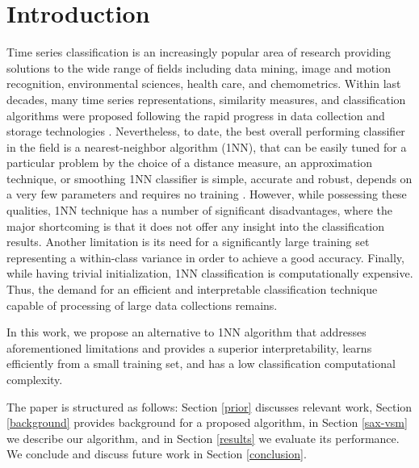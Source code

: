 \documentclass[conference]{IEEEtran}
\begin{document}
\section{Introduction}
Time series classification is an increasingly popular area of research providing 
solutions to the wide range of fields including data mining, 
image and motion recognition, environmental sciences, health care, and chemometrics. 
Within last decades, many time series representations, similarity measures, 
and classification algorithms were proposed following the rapid
progress in data collection and storage technologies \cite{review}. 
Nevertheless, to date, the best overall performing classifier in the field is
a nearest-neighbor algorithm (1NN), that can be easily tuned for a 
particular problem by the choice of a distance measure, 
an approximation technique, or smoothing \cite{review}
1NN classifier is simple, accurate and robust, depends on a very few parameters 
and requires no training \cite{review, benchmark, classifiers}.
However, while possessing these qualities, 1NN technique has a number of 
significant disadvantages, where the major shortcoming is that it does not 
offer any insight into the classification results.
Another limitation is its need for a significantly large training set 
representing a within-class variance in order to achieve a good accuracy. 
Finally, while having trivial initialization, 1NN classification is computationally expensive. 
Thus, the demand for an efficient and interpretable classification technique 
capable of processing of large data collections remains.

In this work, we propose an alternative to 1NN algorithm that addresses 
aforementioned limitations and provides a superior interpretability, 
learns efficiently from a small training set, and has a low classification 
computational complexity.

The paper is structured as follows: 
Section \ref{prior} discusses relevant work, Section \ref{background} provides 
background for a proposed algorithm, in Section \ref{sax-vsm} we describe our algorithm, 
and in Section \ref{results} we evaluate its performance. 
We conclude and discuss future work in Section \ref{conclusion}.

\vspace{-0.2cm}
\end{document}
